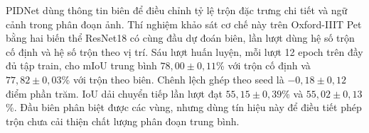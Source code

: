 PIDNet dùng thông tin biên để điều chỉnh tỷ lệ trộn đặc trưng chi tiết và ngữ cảnh trong phân đoạn ảnh. Thí nghiệm khảo sát cơ chế này trên Oxford-IIIT Pet bằng hai biến thể ResNet18 có cùng đầu dự đoán biên, lần lượt dùng hệ số trộn cố định và hệ số trộn theo vị trí. Sáu lượt huấn luyện, mỗi lượt 12 epoch trên đầy đủ tập train, cho mIoU trung bình $78{,}00\pm0{,}11$\% với trộn cố định và $77{,}82\pm0{,}03$\% với trộn theo biên. Chênh lệch ghép theo seed là $-0{,}18\pm0{,}12$ điểm phần trăm. IoU dải chuyển tiếp lần lượt đạt $55{,}15\pm0{,}39$\% và $55{,}02\pm0{,}13$\%. Đầu biên phân biệt được các vùng, nhưng dùng tín hiệu này để điều tiết phép trộn chưa cải thiện chất lượng phân đoạn trung bình.
